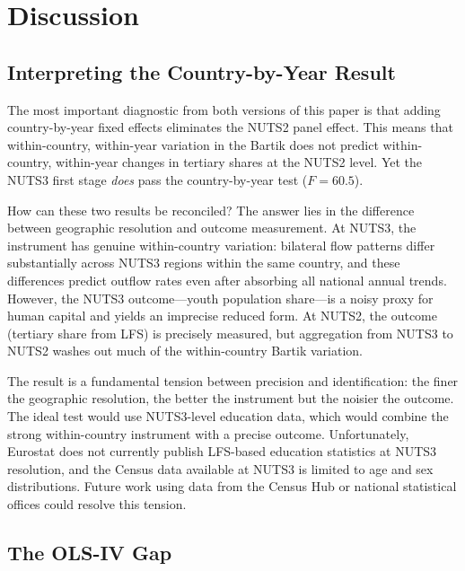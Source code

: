 \documentclass[12pt]{article}
\begin{document}



\section{Discussion}
\label{sec:discussion}

\subsection{Interpreting the Country-by-Year Result}

The most important diagnostic from both versions of this paper is that adding country-by-year fixed effects eliminates the NUTS2 panel effect. This means that within-country, within-year variation in the Bartik does not predict within-country, within-year changes in tertiary shares at the NUTS2 level. Yet the NUTS3 first stage \emph{does} pass the country-by-year test ($F = 60.5$).

How can these two results be reconciled? The answer lies in the difference between geographic resolution and outcome measurement. At NUTS3, the instrument has genuine within-country variation: bilateral flow patterns differ substantially across NUTS3 regions within the same country, and these differences predict outflow rates even after absorbing all national annual trends. However, the NUTS3 outcome---youth population share---is a noisy proxy for human capital and yields an imprecise reduced form. At NUTS2, the outcome (tertiary share from LFS) is precisely measured, but aggregation from NUTS3 to NUTS2 washes out much of the within-country Bartik variation.

The result is a fundamental tension between precision and identification: the finer the geographic resolution, the better the instrument but the noisier the outcome. The ideal test would use NUTS3-level education data, which would combine the strong within-country instrument with a precise outcome. Unfortunately, Eurostat does not currently publish LFS-based education statistics at NUTS3 resolution, and the Census data available at NUTS3 is limited to age and sex distributions. Future work using data from the Census Hub or national statistical offices could resolve this tension.

\subsection{The OLS-IV Gap}
\end{document}
